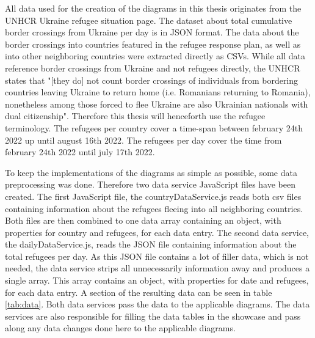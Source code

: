 All data used for the creation of the diagrams in this thesis originates from the UNHCR Ukraine refugee situation page\cite{unhcr}. The dataset about total cumulative border crossings from Ukraine per day\cite{unhcr_rpd} is in JSON format. The data about the border crossings into countries featured in the refugee response plan, as well as into other neighboring countries\cite{unhcr} were extracted directly as CSVs. While all data reference border crossings from Ukraine and not refugees directly, the UNHCR states that "[they do] not count border crossings of individuals from bordering countries leaving Ukraine to return home (i.e. Romanians returning to Romania), nonetheless among those forced to flee Ukraine are also Ukrainian nationals with dual citizenship"\cite{unhcr_note}. Therefore this thesis will henceforth use the refugee terminology.
The refugees per country cover a time-span between february 24th 2022 up until august 16th 2022\cite{unhcr}. The refugees per day cover the time from february 24th 2022 until july 17th 2022\cite{unhcr_rpd}.




To keep the implementations of the diagrams as simple as possible, some data preprocessing was done. Therefore two data service JavaScript files have been created. The first JavaScript file, the countryDataService.js reads both csv files containing information about the refugees fleeing into all neighboring countries. Both files are then combined to one data array containing an object, with properties for country and refugees, for each data entry. The second data service, the dailyDataService.js, reads the JSON file containing information about the total refugees per day. As this JSON file contains a lot of filler data, which is not needed, the data service strips all unnecessarily information away and produces a single array. This array contains an object, with properties for date and refugees, for each data entry. A section of the resulting data can be seen in table \ref{tab:data}. Both data services pass the data to the applicable diagrams. The data services are also responsible for filling the data tables in the showcase and pass along any data changes done here to the applicable diagrams.

